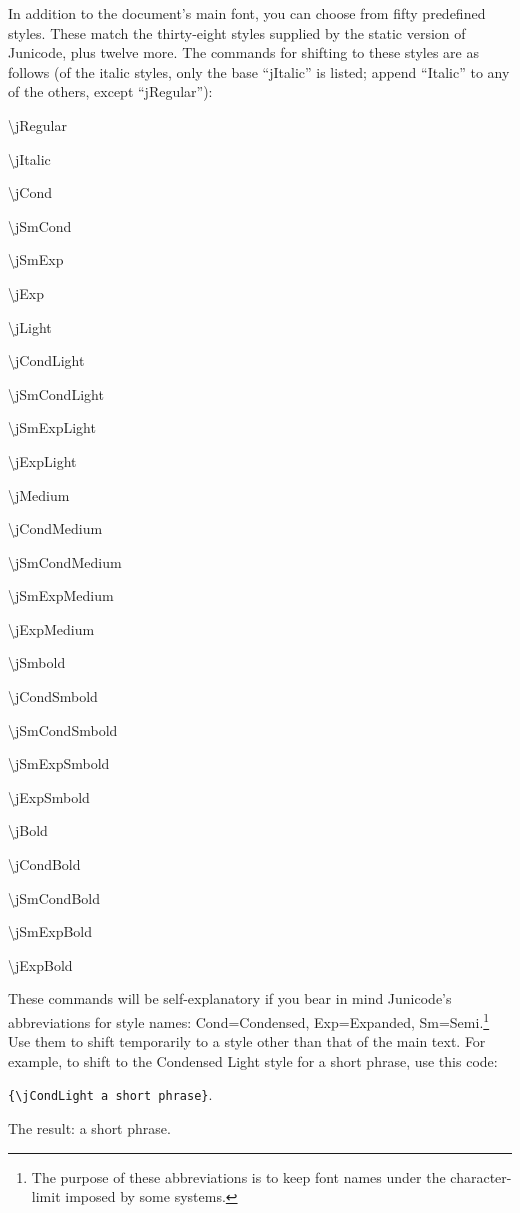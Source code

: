 \documentclass[12pt]{article}
\begin{document}
In addition to the document's main font, you can choose from fifty
predefined styles. These match the thirty-eight styles supplied by the
static version of Junicode, plus twelve more. The commands for shifting to these
styles are as follows (of the italic styles, only the base “jItalic” is listed;
append “Italic” to any of the others, except “jRegular”):

\begin{multicols}{3}
    \jCond\textbackslash jRegular

    \textbackslash jItalic
    
    \textbackslash jCond
    
    \textbackslash jSmCond
    
    \textbackslash jSmExp
    
    \textbackslash jExp
    
    \textbackslash jLight
    
    \textbackslash jCondLight
    
    \textbackslash jSmCondLight
    
    \textbackslash jSmExpLight
    
    \textbackslash jExpLight
    
    \textbackslash jMedium
    
    \textbackslash jCondMedium
    
    \textbackslash jSmCondMedium
    
    \textbackslash jSmExpMedium
    
    \textbackslash jExpMedium
    
    \textbackslash jSmbold
    
    \textbackslash jCondSmbold
    
    \textbackslash jSmCondSmbold
    
    \textbackslash jSmExpSmbold
    
    \textbackslash jExpSmbold
    
    \textbackslash jBold
    
    \textbackslash jCondBold
    
    \textbackslash jSmCondBold
    
    \textbackslash jSmExpBold
    
    \textbackslash jExpBold
    
\end{multicols}

\noindent These commands will be self-explanatory if you bear in mind Junicode's 
abbreviations for style names: Cond=Condensed, Exp=Expanded, Sm=Semi.\footnote{%
The purpose of these abbreviations is to keep font names under the character-limit
imposed by some systems.} Use
them to shift temporarily to a style other than that of the main text.
For example, to shift to the Condensed Light style for a short phrase, use
this code:
\begin{center}
{\small\verb|{\jCondLight a short phrase}|}.
\end{center}
The result: {\jCondLight a short phrase}.
\end{document}
